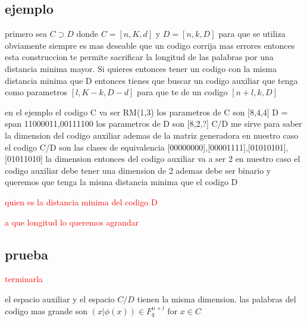 \documentclass[12p]{article}
\newcommand{\rojo}[1]{
  \textcolor{red}{#1}
}
\begin{document}
\subsection{ejemplo}
primero sea $C \supset D$ donde $C = [n,K,d]$ y $ D = [n,k,D]$
para que se utiliza 
obviamente siempre es mas deseable que un codigo corrija mas errores
entonces esta construccion te permite sacrificar la longitud de las palabras
por una distancia minima mayor.
Si quieres entonces tener un codigo con la misma distancia minima que D
entonces tienes que buscar un codigo auxiliar que tenga como parametros
$[l,K-k,D-d]$ para que te de un codigo $[n+l,k,D]$

en el ejemplo el codigo C va ser  RM(1,3)
los parametros de C son [8,4,4]
D = span 11000011,00111100
los parametros de D son [8,2,?]
C/D me sirve para saber la dimension del codigo auxiliar
ademas de la matriz generadora 
en nuestro caso el codigo C/D son las clases de equivalencia
{[00000000],[00001111],[01010101],[01011010]}
la dimension entonces del codigo auxiliar va a ser 2 
en nuestro caso el codigo auxiliar debe tener una dimension de 2 
ademas debe ser binario y queremos que tenga la misma distancia minima
que el codigo D
\rojo{quien es la distancia minima del codigo D }
\rojo{a que longitud lo queremos agrandar}

\subsection{prueba}
\rojo{terminarla}
el espacio auxiliar y el espacio $ C / D $ tienen la misma dimension.
las palabras del codigo mas grande son $ ( x | \phi(x)) \in F _ q ^{ n + l } \text{ for } x \in C $
\end{document}
